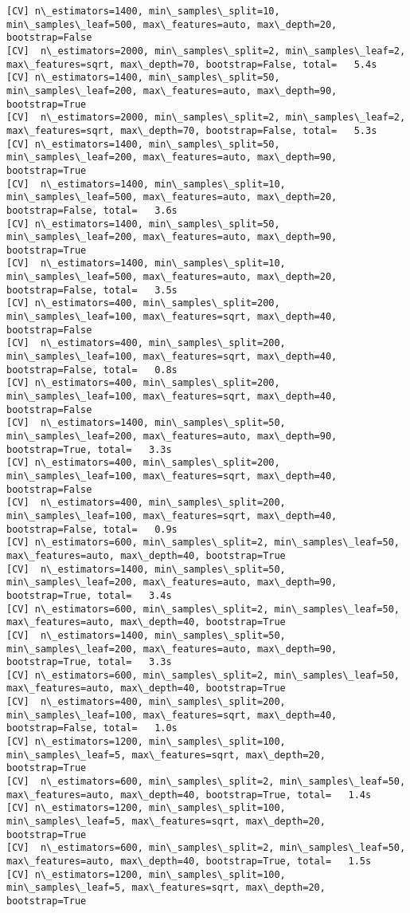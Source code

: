 \documentclass[11pt]{article}
\begin{document}
\begin{Verbatim}[commandchars=\\\{\}]
[CV] n\_estimators=1400, min\_samples\_split=10, min\_samples\_leaf=500, max\_features=auto, max\_depth=20, bootstrap=False 
[CV]  n\_estimators=2000, min\_samples\_split=2, min\_samples\_leaf=2, max\_features=sqrt, max\_depth=70, bootstrap=False, total=   5.4s
[CV] n\_estimators=1400, min\_samples\_split=50, min\_samples\_leaf=200, max\_features=auto, max\_depth=90, bootstrap=True 
[CV]  n\_estimators=2000, min\_samples\_split=2, min\_samples\_leaf=2, max\_features=sqrt, max\_depth=70, bootstrap=False, total=   5.3s
[CV] n\_estimators=1400, min\_samples\_split=50, min\_samples\_leaf=200, max\_features=auto, max\_depth=90, bootstrap=True 
[CV]  n\_estimators=1400, min\_samples\_split=10, min\_samples\_leaf=500, max\_features=auto, max\_depth=20, bootstrap=False, total=   3.6s
[CV] n\_estimators=1400, min\_samples\_split=50, min\_samples\_leaf=200, max\_features=auto, max\_depth=90, bootstrap=True 
[CV]  n\_estimators=1400, min\_samples\_split=10, min\_samples\_leaf=500, max\_features=auto, max\_depth=20, bootstrap=False, total=   3.5s
[CV] n\_estimators=400, min\_samples\_split=200, min\_samples\_leaf=100, max\_features=sqrt, max\_depth=40, bootstrap=False 
[CV]  n\_estimators=400, min\_samples\_split=200, min\_samples\_leaf=100, max\_features=sqrt, max\_depth=40, bootstrap=False, total=   0.8s
[CV] n\_estimators=400, min\_samples\_split=200, min\_samples\_leaf=100, max\_features=sqrt, max\_depth=40, bootstrap=False 
[CV]  n\_estimators=1400, min\_samples\_split=50, min\_samples\_leaf=200, max\_features=auto, max\_depth=90, bootstrap=True, total=   3.3s
[CV] n\_estimators=400, min\_samples\_split=200, min\_samples\_leaf=100, max\_features=sqrt, max\_depth=40, bootstrap=False 
[CV]  n\_estimators=400, min\_samples\_split=200, min\_samples\_leaf=100, max\_features=sqrt, max\_depth=40, bootstrap=False, total=   0.9s
[CV] n\_estimators=600, min\_samples\_split=2, min\_samples\_leaf=50, max\_features=auto, max\_depth=40, bootstrap=True 
[CV]  n\_estimators=1400, min\_samples\_split=50, min\_samples\_leaf=200, max\_features=auto, max\_depth=90, bootstrap=True, total=   3.4s
[CV] n\_estimators=600, min\_samples\_split=2, min\_samples\_leaf=50, max\_features=auto, max\_depth=40, bootstrap=True 
[CV]  n\_estimators=1400, min\_samples\_split=50, min\_samples\_leaf=200, max\_features=auto, max\_depth=90, bootstrap=True, total=   3.3s
[CV] n\_estimators=600, min\_samples\_split=2, min\_samples\_leaf=50, max\_features=auto, max\_depth=40, bootstrap=True 
[CV]  n\_estimators=400, min\_samples\_split=200, min\_samples\_leaf=100, max\_features=sqrt, max\_depth=40, bootstrap=False, total=   1.0s
[CV] n\_estimators=1200, min\_samples\_split=100, min\_samples\_leaf=5, max\_features=sqrt, max\_depth=20, bootstrap=True 
[CV]  n\_estimators=600, min\_samples\_split=2, min\_samples\_leaf=50, max\_features=auto, max\_depth=40, bootstrap=True, total=   1.4s
[CV] n\_estimators=1200, min\_samples\_split=100, min\_samples\_leaf=5, max\_features=sqrt, max\_depth=20, bootstrap=True 
[CV]  n\_estimators=600, min\_samples\_split=2, min\_samples\_leaf=50, max\_features=auto, max\_depth=40, bootstrap=True, total=   1.5s
[CV] n\_estimators=1200, min\_samples\_split=100, min\_samples\_leaf=5, max\_features=sqrt, max\_depth=20, bootstrap=True 


\end{Verbatim}
\end{document}
